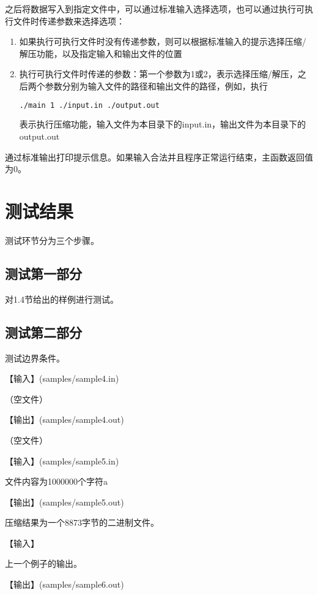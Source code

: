 \documentclass{article}
\begin{document}
之后将数据写入到指定文件中，可以通过标准输入选择选项，也可以通过执行可执行文件时传递参数来选择选项：

\begin{enumerate}
    \item 如果执行可执行文件时没有传递参数，则可以根据标准输入的提示选择压缩/解压功能，以及指定输入和输出文件的位置
    \item 执行可执行文件时传递的参数：第一个参数为1或2，表示选择压缩/解压，之后两个参数分别为输入文件的路径和输出文件的路径，例如，执行
\begin{lstlisting}[language={bash},
    basicstyle=\small\consolas]
./main 1 ./input.in ./output.out
\end{lstlisting}
    表示执行压缩功能，输入文件为本目录下的input.in，输出文件为本目录下的output.out
\end{enumerate}

通过标准输出打印提示信息。如果输入合法并且程序正常运行结束，主函数返回值为0。

\section{测试结果}

测试环节分为三个步骤。

\subsection{测试第一部分}

对1.4节给出的样例进行测试。

\subsection{测试第二部分}

测试边界条件。

【输入】(samples/sample4.in)

（空文件）

【输出】(samples/sample4.out)

（空文件）

【输入】(samples/sample5.in)

文件内容为1000000个字符a

【输出】(samples/sample5.out)

压缩结果为一个8873字节的二进制文件。

【输入】

上一个例子的输出。

【输出】(samples/sample6.out)
\end{document}
